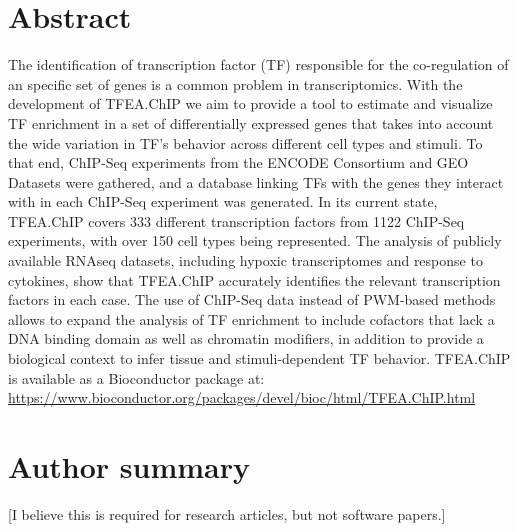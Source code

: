 \documentclass[10pt,letterpaper]{article}
\begin{document}
	\section*{Abstract}
	The identification of transcription factor (TF) responsible for the co-regulation of an specific set of genes is a common problem in transcriptomics. With the development of TFEA.ChIP we aim to provide a tool to estimate and visualize TF enrichment in a set of differentially expressed genes that takes into account the wide variation in TF's behavior across different cell types and stimuli. To that end, ChIP-Seq experiments from the ENCODE Consortium and GEO Datasets were gathered, and a database linking TFs with the genes they interact with in each ChIP-Seq experiment was generated. In its current state, TFEA.ChIP covers 333 different transcription factors from 1122 ChIP-Seq experiments, with over 150 cell types being represented. The analysis of publicly available RNAseq datasets, including hypoxic transcriptomes and response to cytokines, show that TFEA.ChIP accurately identifies the relevant transcription factors in each case. The use of ChIP-Seq data instead of PWM-based methods allows to expand the analysis of TF enrichment to include cofactors that lack a DNA binding domain as well as chromatin modifiers, in addition to provide a biological context to infer tissue and stimuli-dependent TF behavior. TFEA.ChIP is available as a Bioconductor package at: \url{https://www.bioconductor.org/packages/devel/bioc/html/TFEA.ChIP.html} 
	
	
	\section*{Author summary}
	[I believe this is required for research articles, but not software papers.]
	\linenumbers
	
\end{document}
